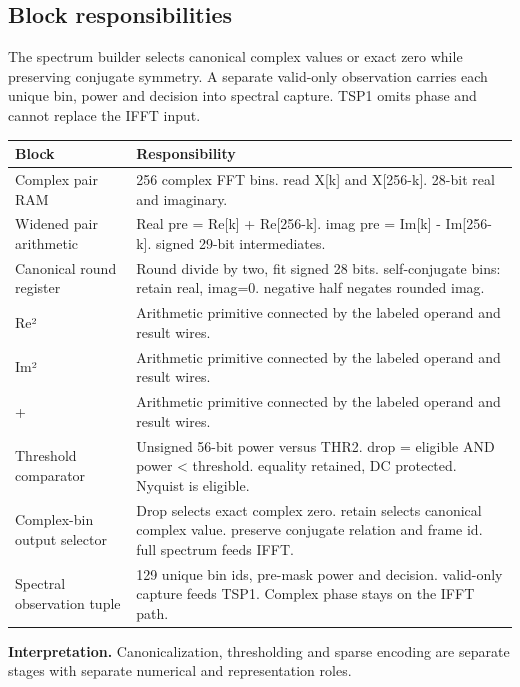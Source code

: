 \documentclass[11pt,letterpaper]{article}
\begin{document}
\subsection*{Block responsibilities}
The spectrum builder selects canonical complex values or exact zero while preserving conjugate symmetry. A separate valid-only observation carries each unique bin, power and decision into spectral capture. TSP1 omits phase and cannot replace the IFFT input.
\par\medskip\noindent
\begin{tabularx}{\linewidth}{@{}>{\raggedright\arraybackslash}p{1.65in}Y@{}}\toprule
\textbf{Block} & \textbf{Responsibility} \\ \midrule
Complex pair RAM & 256 complex FFT bins. read X[k] and X[256-k]. 28-bit real and imaginary. \\[5pt]
Widened pair arithmetic & Real pre = Re[k] + Re[256-k]. imag pre = Im[k] - Im[256-k]. signed 29-bit intermediates. \\[5pt]
Canonical round register & Round divide by two, fit signed 28 bits. self-conjugate bins: retain real, imag=0. negative half negates rounded imag. \\[5pt]
Re² & Arithmetic primitive connected by the labeled operand and result wires. \\[5pt]
Im² & Arithmetic primitive connected by the labeled operand and result wires. \\[5pt]
+ & Arithmetic primitive connected by the labeled operand and result wires. \\[5pt]
Threshold comparator & Unsigned 56-bit power versus THR2. drop = eligible AND power < threshold. equality retained, DC protected. Nyquist is eligible. \\[5pt]
Complex-bin output selector & Drop selects exact complex zero. retain selects canonical complex value. preserve conjugate relation and frame id. full spectrum feeds IFFT. \\[5pt]
Spectral observation tuple & 129 unique bin ids, pre-mask power and decision. valid-only capture feeds TSP1. Complex phase stays on the IFFT path. \\[5pt]
\bottomrule\end{tabularx}
\vspace{8pt}
\noindent\textbf{Interpretation.} Canonicalization, thresholding and sparse encoding are separate stages with separate numerical and representation roles.
\clearpage
\end{document}
